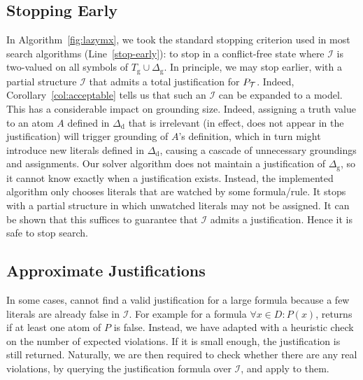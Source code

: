 \documentclass[11pt]{article}
\newcommand{\m}[1]{\ensuremath{#1}\xspace}
\newcommand{\I}{\m{\mathcal{I}}}
\newcommand{\theory}{\m{\mathcal{T}}}
\newcommand{\D}{\m{\Delta}}
\theoremstyle{plain}
\theoremstyle{definition}
\theoremstyle{example_basic}
\theoremstyle{example_contd}
\theoremstyle{plain}
\newcommand{\Dg}{\ensuremath{\D_\text{g}}\xspace}
\newcommand{\Dd}{\ensuremath{\D_\text{d}}\xspace}
\newcommand{\Sg}{\ensuremath{T_\text{g}}\xspace}
\newcommand{\pt}{\ensuremath{P_\text{\theory}}\xspace}
\newcommand{\change}[1]{#1}
\begin{document}
\subsection{Stopping Early} 
\change{In Algorithm~\ref{fig:lazymx}, we took the standard stopping criterion used in most search algorithms (Line~\ref{stop-early}): to stop in a conflict-free state where \I is two-valued on all symbols of $\Sg \cup \Dg$.  In principle, we may stop earlier,  with a partial  structure \I that admits a total justification for \pt. Indeed,  Corollary~\ref{col:acceptable}  tells us that such an $\I$ can be expanded to a model. This has a considerable impact on grounding size. Indeed, assigning a truth value to an atom $A$ defined in \Dd that is irrelevant (in effect, does not appear in the justification) will trigger grounding of $A$'s definition, which in turn might introduce new literals defined in \Dd, causing a cascade of unnecessary groundings and assignments. Our solver algorithm does not maintain a justification of \Dg, so it cannot know exactly when a justification exists. Instead, the implemented algorithm only chooses literals that are watched by some formula/rule. It stops with a partial structure in which unwatched literals may not be assigned. It can be shown that this suffices to guarantee that \I admits a justification. Hence it is safe to stop search.}

\subsection{Approximate Justifications}
In some cases, \buildconstr cannot find a valid justification for a large formula because a few literals are already false in \I. For example for a formula $\forall x\in D: P(x)$, \buildconstr returns \algfalse if at least one atom of $P$ is false. Instead, we \change{have adapted} \buildconstr with a heuristic check on the number of expected violations. If it is small enough, the justification is still returned. Naturally, we are then required to check whether there are any real violations, by querying the justification formula over \I, and apply \lazyground to them.
\end{document}
